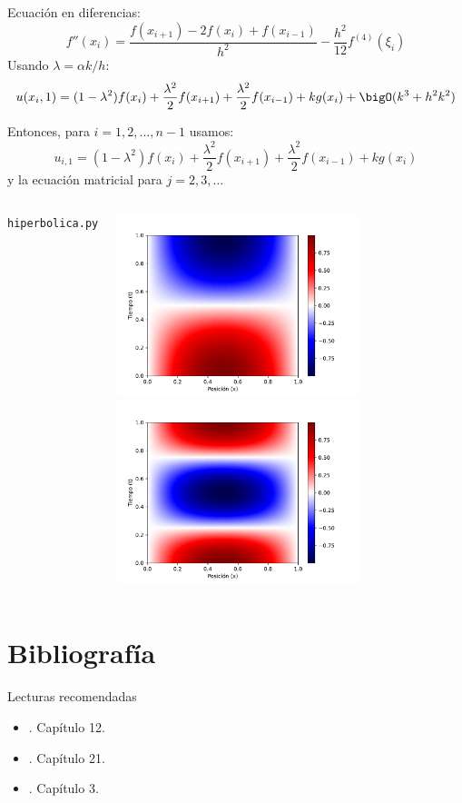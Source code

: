 \documentclass[9pt, aspectratio=169]{beamer}
\begin{document}
\begin{frame}
Ecuación en diferencias:
\[ f''(x_i) = \frac{f(x_{i+1}) - 2 f(x_i) + f(x_{i-1})}{h^2} - \frac{h^2}{12} f^{(4)}(\xi_i) \]
Usando $\lambda = \alpha k / h$:
\[ u(x_i, 1) = (1-\lambda^2)f(x_i) + \frac{\lambda^2}{2} f(x_{i+1}) + \frac{\lambda^2}{2} f(x_{i-1}) + k g(x_i) + \bigO(k^3 + h^2 k^2) \]

Entonces, para $i = 1, 2, \ldots, n-1$ usamos:
\[ u_{i, 1} = (1-\lambda^2)f(x_i) + \frac{\lambda^2}{2} f(x_{i+1}) + \frac{\lambda^2}{2} f(x_{i-1}) + k g(x_i) \]
y la ecuación matricial para $j = 2, 3, \ldots$

\end{frame}

\begin{frame}
\begin{columns}
\texttt{hiperbolica.py}
\pause

\begin{center}
    \includegraphics[width=0.7\textwidth]{code/onda-1.pdf}
    \includegraphics[width=0.7\textwidth]{code/onda-2.pdf}
\end{center}
\end{columns}
\end{frame}

\section*{Bibliografía}
\begin{frame}[allowframebreaks]{Lecturas recomendadas}
\begin{itemize}
    \item {}. Capítulo 12.
\item {}. Capítulo 21.
    \item {}. Capítulo 3.
\end{itemize}
\end{frame}
\end{document}
